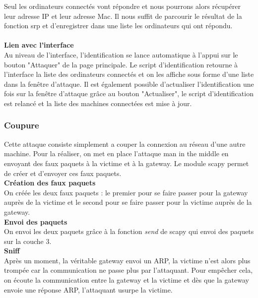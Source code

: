 \documentclass[11pt]{article}
\begin{document}
Seul les ordinateurs connectés vont répondre et nous pourrons alors récupérer leur adresse IP et leur adresse Mac. Il nous suffit de parcourir le résultat de la fonction srp et d'enregistrer dans une liste les ordinateurs qui ont répondu.~\\
~\\
\textbf{Lien avec l'interface}~\\

Au niveau de l'interface, l'identification se lance automatique à l'appui sur le bouton "Attaquer" de la page principale. Le script d'identification retourne à l'interface la liste des ordinateurs connectés et on les affiche sous forme d'une liste dans la fenêtre d'attaque. Il est également possible d'actualiser l'identification une fois sur la fenêtre d'attaque grâce au bouton "Actualiser", le script d'identification est relancé et la liste des machines connectées est mise à jour.

\subsubsection{Coupure}
Cette attaque consiste simplement a couper la connexion au réseau d'une autre machine. Pour la réaliser, on met en place l'attaque man in the middle en envoyant des faux paquets à la victime et à la gateway. Le module scapy permet de créer et d'envoyer ces faux paquets.~\\

\textbf{Création des faux paquets}~\\

On créée les deux faux paquets : le premier pour se faire passer pour la gateway auprès de la victime et le second pour se faire passer pour la victime auprès de la gateway.~\\


\textbf{Envoi des paquets}~\\

On envoi les deux paquets grâce à la fonction \textit{send} de scapy qui envoi des paquets sur la couche 3.~\\


\textbf{Sniff}~\\

Après un moment, la véritable gateway envoi un ARP, la victime n'est alors plus trompée car la communication ne passe plus par l'attaquant. Pour empêcher cela, on écoute la communication entre la gateway et la victime et dès que la gateway envoie une réponse ARP, l'attaquant usurpe la victime.~\\

\end{document}
